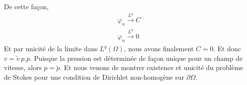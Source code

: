 De cette façon, 
\begin{align*}
    &\varphi_n \xrightarrow[]{L^q} C \\
    &\varphi_n \xrightarrow[]{L^q} 0
\end{align*}
Et par unicité de la limite dans $L^q(\Omega)$, nous avons finalement $C = 0$. Et donc $v = \tilde{v} \ p.p.$
Puisque la pression est déterminée de façon unique pour un champ de vitesse, alors $p = \tilde{p}$. Et nous venons de montrer existence et unicité du problème de Stokes pour une condition de Dirichlet non-homogène sur $\partial \Omega$.
